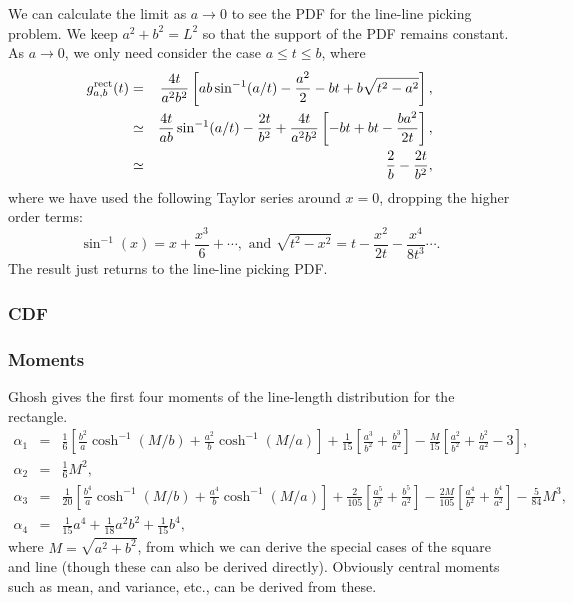 We can calculate the limit as $a \rightarrow 0$ to see the PDF for the
line-line picking problem.  We keep $a^2 + b^2 = L^2$ so that the
support of the PDF remains constant.  As $a \rightarrow 0$, we only
need consider the case $a \leq t \leq b$, where
\begin{eqnarray}
    g^{\rm rect}_{a,b}(t)
        & = & \frac{4 t}{a^2 b^2} 
                  \left[ a b \sin^{-1} (a/t) - \frac{a^2}{2} - b t + b\sqrt{t^2 - a^2} \right] , \nonumber \\
        & \simeq & \frac{4t }{a b} \sin^{-1} (a/t)
                   - \frac{2 t}{b^2}
                    + \frac{4 t}{a^2 b^2} \left[ -b t + b t - \frac{b a^2}{2 t} \right] , \nonumber \\
        & \simeq & \frac{2}{b}
                   - \frac{2 t}{b^2}, 
\end{eqnarray}
where we have used the following Taylor series around $x=0$, dropping
the higher order terms:
\[ \sin^{-1}(x) = x + \frac{x^3}{6} + \cdots, 
   \mbox{ and }
   \sqrt{t^2 - x^2} = t - \frac{x^2}{2t} - \frac{x^4}{8 t^3} \cdots .
\]
The result just returns to the line-line picking PDF.

\subsubsection{CDF}


\subsubsection{Moments}

Ghosh \cite{b.ghosh51:_random_rect} gives the first four moments of
the line-length distribution for the rectangle.
\begin{eqnarray}
  \label{eq:rect_moments} 
  \alpha_1 & = & \frac{1}{6} \left[ 
                        \frac{b^2}{a} \cosh^{-1}\left( M/b \right) +
                        \frac{a^2}{b} \cosh^{-1}\left( M/a \right) 
                 \right]
                  + \frac{1}{15} \left[ \frac{a^3}{b^2} + \frac{b^3}{a^2} \right]
                  - \frac{M}{15} \left[ \frac{a^2}{b^2} + \frac{b^2}{a^2} -3 \right],
\\
  \alpha_2 & = & \frac{1}{6} M^2, \\
  \alpha_3 & = & \frac{1}{20} \left[ 
                        \frac{b^4}{a} \cosh^{-1}\left( M/b \right) +
                        \frac{a^4}{b} \cosh^{-1}\left( M/a \right) 
                 \right]
                  + \frac{2}{105} \left[ \frac{a^5}{b^2} + \frac{b^5}{a^2} \right]
                  - \frac{2M}{105} \left[ \frac{a^4}{b^2} + \frac{b^4}{a^2}\right]
                        - \frac{5}{84} M^3, 
\\
  \alpha_4 & = & \frac{1}{15} a^4 + \frac{1}{18} a^2 b^2 + \frac{1}{15} b^4,
\end{eqnarray}
where $M = \sqrt{a^2 + b^2}$, from which we can derive the special
cases of the square and line (though these can also be derived
directly). Obviously central moments such as mean, and variance, etc.,
can be derived from these. 
